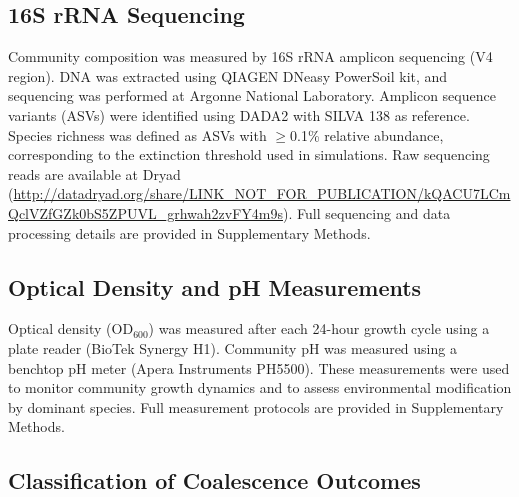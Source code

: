 \subsection*{16S rRNA Sequencing}
\label{sec:methods:sequencing}

Community composition was measured by 16S rRNA amplicon sequencing (V4 region). DNA was extracted using QIAGEN DNeasy PowerSoil kit, and sequencing was performed at Argonne National Laboratory. Amplicon sequence variants (ASVs) were identified using DADA2\citep{Callahan2016} with SILVA 138\citep{Quast2013} as reference. Species richness was defined as ASVs with $\geq$0.1\% relative abundance, corresponding to the extinction threshold used in simulations. Raw sequencing reads are available at Dryad (\url{http://datadryad.org/share/LINK_NOT_FOR_PUBLICATION/kQACU7LCmQclVZfGZk0bS5ZPUVL_grhwah2zvFY4m9s}). Full sequencing and data processing details are provided in Supplementary Methods.


\subsection*{Optical Density and pH Measurements}
\label{sec:methods:od_ph}

Optical density (OD$_{600}$) was measured after each 24-hour growth cycle using a plate reader (BioTek Synergy H1). Community pH was measured using a benchtop pH meter (Apera Instruments PH5500). These measurements were used to monitor community growth dynamics and to assess environmental modification by dominant species. Full measurement protocols are provided in Supplementary Methods.


\subsection*{Classification of Coalescence Outcomes}
\label{sec:methods:classification}

